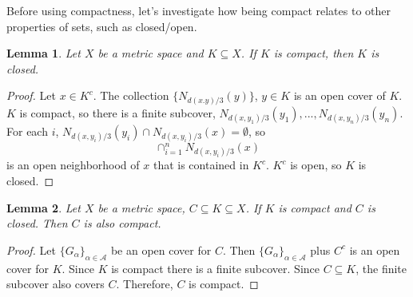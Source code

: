 \documentclass[12pt,reqno]{amsart}
\newtheorem{lemma}{Lemma}[section]
\theoremstyle{definition}
\begin{document}
Before using compactness, let's investigate how being compact relates
to other properties of sets, such as closed/open. 
\begin{lemma}\label{lem:compactClosed}
  Let $X$ be a metric space and $K \subseteq X$. If $K$ is compact,
  then $K$ is closed.
\end{lemma}
\begin{proof}
  Let $x \in K^c$. The collection $\{N_{d(x.y)/3}(y)\}$, $y\in K$ is an
  open cover of $K$. $K$ is compact, so there is a finite subcover,
  $N_{d(x,y_1)/3}(y_1), ... , N_{d(x,y_n)/3}(y_n)$.  For each $i$,
  $N_{d(x,y_i)/3}(y_i) \cap N_{d(x,y_i)/3}(x) = \emptyset$, so 
  \[ \cap_{i=1}^n N_{d(x,y_i)/3}(x) \]
  is an open neighborhood of $x$ that is contained in $K^c$. $K^c$ is
  open, so $K$ is closed.
\end{proof}
\begin{lemma}
  Let $X$ be a metric space, $C \subseteq K \subseteq X$. If $K$ is
  compact and $C$ is closed. Then $C$ is also compact.
\end{lemma}
\begin{proof}
  Let $\{G_\alpha\}_{\alpha \in \mathcal{A}}$ be an open cover for
  $C$. Then $\{G_\alpha\}_{\alpha \in \mathcal{A}}$ plus $C^c$ is an
  open cover for $K$. Since $K$ is compact there is a finite
  subcover. Since $C \subseteq K$, the finite subcover also covers
  $C$. Therefore, $C$ is compact. 
\end{proof}
\end{document}
